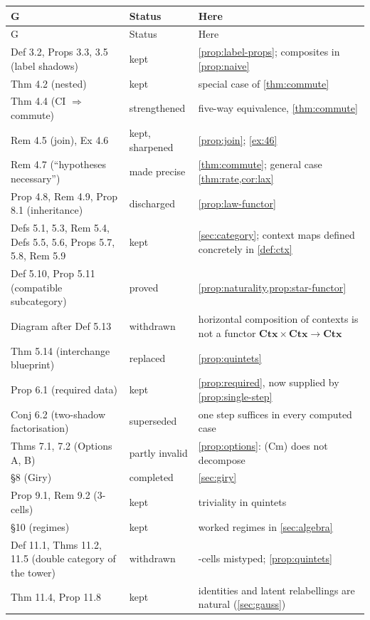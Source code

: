 \documentclass[11pt]{article}
\theoremstyle{definition}
\newcommand{\Ctx}{\mathbf{Ctx}}
\begin{document}
\begin{longtable}{>{\raggedright}p{4.4cm}>{\raggedright}p{2.2cm}>{\raggedright\arraybackslash}p{7.8cm}}
\toprule G & Status & Here\\\midrule\endfirsthead\toprule G & Status & Here\\\midrule\endhead
Def 3.2, Props 3.3, 3.5 (label shadows) & kept & \cref{prop:label-props}; composites in \cref{prop:naive}\\
Thm 4.2 (nested) & kept & special case of \cref{thm:commute}\\
Thm 4.4 (CI $\Rightarrow$ commute) & strengthened & five-way equivalence, \cref{thm:commute}\\
Rem 4.5 (join), Ex 4.6 & kept, sharpened & \cref{prop:join}; \cref{ex:46}\\
Rem 4.7 (``hypotheses necessary'') & made precise & \cref{thm:commute}; general case \cref{thm:rate,cor:lax}\\
Prop 4.8, Rem 4.9, Prop 8.1 (inheritance) & discharged & \cref{prop:law-functor}\\
Defs 5.1, 5.3, Rem 5.4, Defs 5.5, 5.6, Props 5.7, 5.8, Rem 5.9 & kept & \cref{sec:category}; context maps defined concretely in \cref{def:ctx}\\
Def 5.10, Prop 5.11 (compatible subcategory) & proved & \cref{prop:naturality,prop:star-functor}\\
Diagram after Def 5.13 & withdrawn & horizontal composition of contexts is not a functor $\Ctx\times\Ctx\to\Ctx$\\
Thm 5.14 (interchange blueprint) & replaced & \cref{prop:quintets}\\
Prop 6.1 (required data) & kept & \cref{prop:required}, now supplied by \cref{prop:single-step}\\
Conj 6.2 (two-shadow factorisation) & superseded & one step suffices in every computed case\\
Thms 7.1, 7.2 (Options A, B) & partly invalid & \cref{prop:options}: (Cm) does not decompose\\
\S8 (Giry) & completed & \cref{sec:giry}\\
Prop 9.1, Rem 9.2 (3-cells) & kept & triviality in quintets\\
\S10 (regimes) & kept & worked regimes in \cref{sec:algebra}\\
Def 11.1, Thms 11.2, 11.5 (double category of the tower) & withdrawn & 2-cells mistyped; \cref{prop:quintets}\\
Thm 11.4, Prop 11.8 & kept & identities and latent relabellings are natural (\cref{sec:gauss})\\

\end{longtable}
\end{document}
